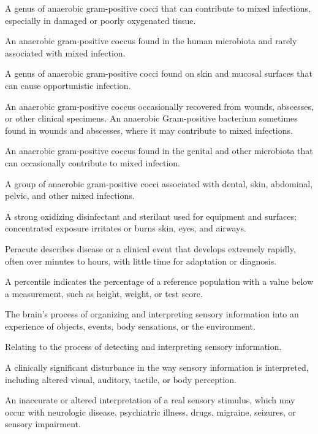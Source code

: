  A genus of anaerobic gram-positive cocci that can contribute to mixed infections, especially in damaged or poorly oxygenated tissue.

 An anaerobic gram-positive coccus found in the human microbiota and rarely associated with mixed infection.

 A genus of anaerobic gram-positive cocci found on skin and mucosal surfaces that can cause opportunistic infection.

 An anaerobic gram-positive coccus occasionally recovered from wounds, abscesses, or other clinical specimens. An anaerobic Gram-positive bacterium sometimes found in wounds and abscesses, where it may contribute to mixed infections.

 An anaerobic gram-positive coccus found in the genital and other microbiota that can occasionally contribute to mixed infection.

 A group of anaerobic gram-positive cocci associated with dental, skin, abdominal, pelvic, and other mixed infections.

 A strong oxidizing disinfectant and sterilant used for equipment and surfaces; concentrated exposure irritates or burns skin, eyes, and airways.

 Peracute describes disease or a clinical event that develops extremely rapidly, often over minutes to hours, with little time for adaptation or diagnosis.

 A percentile indicates the percentage of a reference population with a value below a measurement, such as height, weight, or test score.

 The brain’s process of organizing and interpreting sensory information into an experience of objects, events, body sensations, or the environment.

 Relating to the process of detecting and interpreting sensory information.

 A clinically significant disturbance in the way sensory information is interpreted, including altered visual, auditory, tactile, or body perception.

 An inaccurate or altered interpretation of a real sensory stimulus, which may occur with neurologic disease, psychiatric illness, drugs, migraine, seizures, or sensory impairment.

